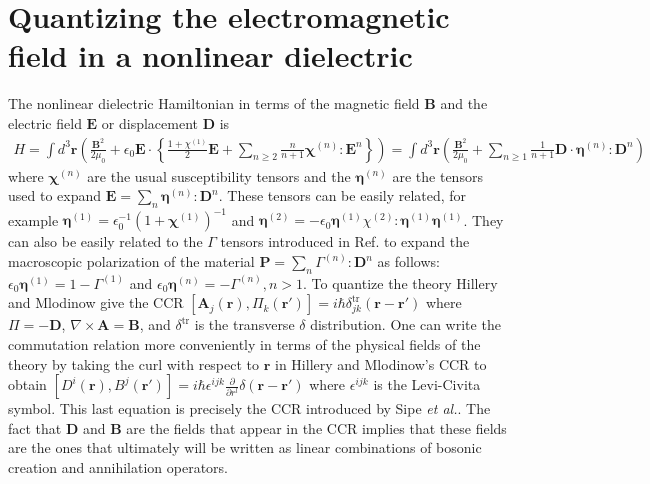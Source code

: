 \documentclass[letterpaper,10pt]{article}
\newcommand{\ea}{\emph{et al.}}
\begin{document}
\section{Quantizing the electromagnetic field in a nonlinear dielectric}
The nonlinear dielectric Hamiltonian in terms of the magnetic field $\mathbf{B}$ and the electric field $\mathbf{E}$ or displacement $\mathbf{D}$ is
\begin{align}\label{hamil}
H=\int d^3 \mathbf{r} \left(\frac{\mathbf{B}^2}{2 \mu_0}+  \epsilon_0 \mathbf{E} \cdot \left\{ \frac{1+\chi^{(1)}}{2}\mathbf{E} + \sum_{n \geq 2} \frac{n}{n+1}  \mathbf{\chi}^{(n)} : \mathbf{E}^n \right\} \right)=\int d^3\mathbf{r} \left(\frac{\mathbf{B}^2}{2 \mu_0} +\sum_{n\geq 1}\frac{1}{n+1}\mathbf{D}\cdot \mathbf{\eta}^{(n)} : \mathbf{D}^n\right)
\end{align}
where $\mathbf{\chi}^{(n)}$ are the usual susceptibility tensors and the $\mathbf{\eta}^{(n)}$ are the tensors used to expand $\mathbf{E}=\sum_{n} \mathbf{\eta}^{(n)} :\mathbf{D}^n$. These tensors can be easily related\cite{drummond}, for example $\mathbf{\eta}^{(1)}=\epsilon_0^{-1}(1+\mathbf{\chi}^{(1)})^{-1}$ and $\mathbf{\eta}^{(2)}=-\epsilon_0 \mathbf{\eta}^{(1)} \chi^{(2)}: \mathbf{\eta}^{(1)} \mathbf{\eta}^{(1)}$. They can also be easily related to the $\Gamma$ tensors introduced in Ref. \cite{sipe} to expand the macroscopic polarization of the material $\mathbf{P}=\sum_{n} \Gamma^{(n)}: \mathbf{D}^n$ as follows: $\epsilon_0 \mathbf{\eta}^{(1)}=1-\Gamma^{(1)}$ and $\epsilon_0\mathbf{\eta}^{(n)}=-\Gamma^{(n)}, n>1$.
To quantize the theory Hillery and Mlodinow give the CCR $[\mathbf{A}_j(\mathbf{r}),\Pi_k(\mathbf{r}')]=i \hbar \delta_{jk}^{\text{tr}}(\mathbf{r}-\mathbf{r}')$ where $\Pi=-\mathbf{D}$, $\nabla \times \mathbf{A}=\mathbf{B}$, and $\delta^{\text{tr}}$ is the transverse $\delta$ distribution. One can write the commutation relation more conveniently in terms of the physical fields of the theory by taking the curl with respect to $\mathbf{r}$ in Hillery and Mlodinow's CCR to obtain $[D^i(\mathbf{r}),B^j(\mathbf{r'})]=i\hbar \epsilon^{ijk} \frac{\partial}{\partial r^l} \delta(\mathbf{r}-\mathbf{r}')$ where $\epsilon^{ijk}$ is the Levi-Civita symbol. This last equation is precisely the CCR introduced by Sipe \ea \cite{sipe}. The fact that $\mathbf{D}$ and $\mathbf{B}$ are the fields that appear in the CCR implies that these fields are the ones that ultimately will be written as linear combinations of bosonic creation and annihilation operators.
\end{document}
